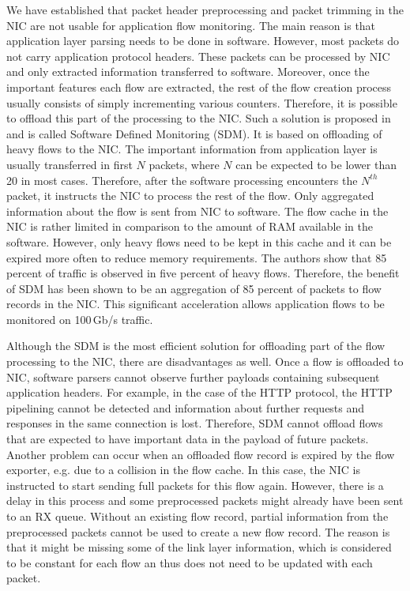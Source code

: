 We have established that packet header preprocessing and packet trimming in the NIC are not usable for application flow monitoring. The main reason is that application layer parsing needs to be done in software. However, most packets do not carry application protocol headers. These packets can be processed by NIC and only extracted information transferred to software. Moreover, once the important features each flow are extracted, the rest of the flow creation process usually consists of simply incrementing various counters. Therefore, it is possible to offload this part of the processing to the NIC. Such a solution is proposed in~\cite{Kekely-2016-Software} and is called Software Defined Monitoring (SDM). It is based on offloading of heavy flows to the NIC. The important information from application layer is usually transferred in first $N$ packets, where $N$ can be expected to be lower than 20 in most cases. Therefore, after the software processing encounters the $N^{th}$ packet, it instructs the NIC to process the rest of the flow. Only aggregated information about the flow is sent from NIC to software. The flow cache in the NIC is rather limited in comparison to the amount of RAM available in the software. However, only heavy flows need to be kept in this cache and it can be expired more often to reduce memory requirements. The authors show that 85 percent of traffic is observed in five percent of heavy flows. Therefore, the benefit of SDM has been shown to be an aggregation of 85 percent of packets to flow records in the NIC. This significant acceleration allows application flows to be monitored on 100\,Gb/s traffic.

Although the SDM is the most efficient solution for offloading part of the flow processing to the NIC, there are disadvantages as well. Once a flow is offloaded to NIC, software parsers cannot observe further payloads containing subsequent application headers. For example, in the case of the HTTP protocol, the HTTP pipelining cannot be detected and information about further requests and responses in the same connection is lost. Therefore, SDM cannot offload flows that are expected to have important data in the payload of future packets. Another problem can occur when an offloaded flow record is expired by the flow exporter, e.g. due to a collision in the flow cache. In this case, the NIC is instructed to start sending full packets for this flow again. However, there is a delay in this process and some preprocessed packets might already have been sent to an RX queue. Without an existing flow record, partial information from the preprocessed packets cannot be used to create a new flow record. The reason is that it might be missing some of the link layer information, which is considered to be constant for each flow an thus does not need to be updated with each packet.

